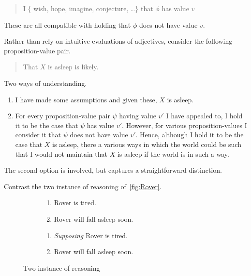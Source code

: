 \begin{note}
  \begin{quote}
    I \(\{\) wish, hope, imagine, conjecture, \dots \(\}\) that \(\phi\) has value \(v\)
  \end{quote}
  These are all compatible with holding that \(\phi\) does not have value \(v\).

  Rather than rely on intuitive evaluations of adjectives, consider the following proposition-value pair.
  \begin{quote}
    That \(X\) is asleep is likely.
  \end{quote}

  Two ways of understanding.
  \begin{enumerate}
  \item I have made some assumptions and given these, \(X\) is asleep.
  \item For every proposition-value pair \(\psi\) having value \(v'\) I have appealed to, I hold it to be the case that \(\psi\) has value \(v'\).
    However, for various proposition-values I consider it \epAdv{} that \(\psi\) does not have value \(v'\).
    Hence, although I hold it to be the case that \(X\) is asleep, there a various ways in which the world could be such that I would not maintain that \(X\) is asleep if the world is in such a way.
  \end{enumerate}
  The second option is involved, but captures a straightforward distinction.
\end{note}

\begin{note}
  Contrast the two instance of reasoning of~\autoref{fig:Rover}.
  \begin{figure}[h!]
    \mbox{}\hfill
    \begin{subfigure}{0.45\linewidth}
      \begin{enumerate}
      \item
        \label{fig:Rover:CS:1}
        Rover is tired.
      \item
        \label{fig:Rover:CS:2}
        Rover will fall asleep soon.
      \end{enumerate}
      \caption{}
      \label{fig:Rover:CS}
    \end{subfigure}
    \hfill
    \begin{subfigure}{0.45\linewidth}
      \begin{enumerate}[label=\arabic*\('\).,ref=(\arabic*\('\))]
      \item
        \label{fig:Rover:nCS:1}
        \emph{Supposing} Rover is tired.
      \item
        \label{fig:Rover:nCS:2}
        Rover will fall asleep soon.
      \end{enumerate}
      \caption{}
      \label{fig:Rover:nCS}
    \end{subfigure}
    \hfill\mbox{}
    \caption{Two instance of reasoning}
    \label{fig:Rover}
  \end{figure}
\end{note}

